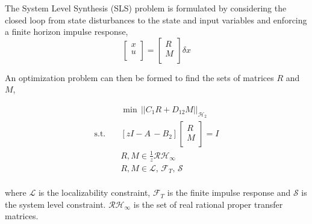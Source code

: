 \documentclass[11pt,a4paper]{article}
\begin{document}
The System Level Synthesis (SLS) problem is formulated by considering the closed loop from state disturbances to the state and input variables and enforcing a finite horizon impulse response,
\begin{equation*}
\begin{bmatrix}
         x \\
         u \\
        \end{bmatrix}
=
\begin{bmatrix}
         R \\
         M \\
        \end{bmatrix}
\delta x
\end{equation*}

An optimization problem can then be formed to find the sets of matrices $R$ and $M$,

\begin{align*}
&\min \, \vert\vert C_{1}R+  D_{12}M\vert\vert_{\mathcal{H}_2} \\
\text{s.t.} \quad &\left[zI-A\, -B_{2} \right]
\begin{bmatrix}
	R \\
	M \\
\end{bmatrix}
 = I \\
&R,M \in \frac{1}{z}\mathcal{R H}_{\infty} \\ 
&R,M \in \mathcal{L}, \,\mathcal{F}_T, \,\mathcal{S} \\
\end{align*}

where $\mathcal{L}$ is the localizability constraint, $\mathcal{F}_T$ is the finite impulse response and $\mathcal{S}$ is the system level constraint. $\mathcal{RH}_{\infty}$ is the set of real rational proper transfer matrices.



\end{document}
